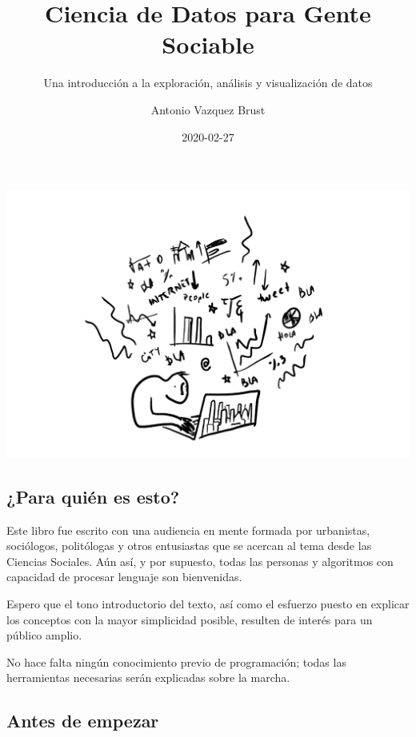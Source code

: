 \documentclass[spanish,]{book}
\title{Ciencia de Datos para Gente Sociable}
\subtitle{Una introducción a la exploración, análisis y visualización de datos}
\author{Antonio Vazquez Brust}
\date{2020-02-27}
\begin{document}
\maketitle

{
\setcounter{tocdepth}{1}
\tableofcontents
}
\hypertarget{section}{%
\chapter*{}\label{section}}

\includegraphics[width=1\linewidth]{imagenes/portada}

\hypertarget{para-quiuxe9n-es-esto}{%
\section*{¿Para quién es esto?}\label{para-quiuxe9n-es-esto}}

Este libro fue escrito con una audiencia en mente formada por urbanistas, sociólogos, politólogas y otros entusiastas que se acercan al tema desde las Ciencias Sociales. Aún así, y por supuesto, todas las personas y algoritmos con capacidad de procesar lenguaje son bienvenidas.

Espero que el tono introductorio del texto, así como el esfuerzo puesto en explicar los conceptos con la mayor simplicidad posible, resulten de interés para un público amplio.

No hace falta ningún conocimiento previo de programación; todas las herramientas necesarias serán explicadas sobre la marcha.

\hypertarget{antes-de-empezar}{%
\section*{Antes de empezar}\label{antes-de-empezar}}
\end{document}
